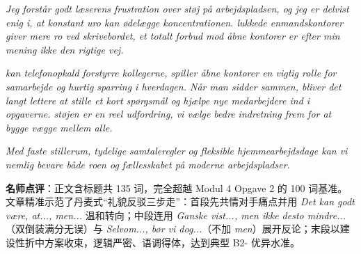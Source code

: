 \begin{answerbox}
\textit{Jeg forstår godt læserens frustration over støj på arbejdspladsen, og jeg er delvist enig i, at konstant uro kan ødelægge koncentrationen.  lukkede enmandskontorer giver mere ro ved skrivebordet,  et totalt forbud mod åbne kontorer er efter min mening ikke den rigtige vej.}

\textit{ kan telefonopkald forstyrre kollegerne,  spiller åbne kontorer en vigtig rolle for samarbejde og hurtig sparring i hverdagen. Når man sidder sammen, bliver det langt lettere at stille et kort spørgsmål og hjælpe nye medarbejdere ind i opgaverne.  støjen er en reel udfordring,  vi  vælge bedre indretning frem for at bygge vægge mellem alle.}

\textit{Med faste stillerum, tydelige samtaleregler og fleksible hjemmearbejdsdage kan vi nemlig bevare både roen og fællesskabet på moderne arbejdspladser.}

\small\textbf{名师点评}：正文含标题共 135 词，完全超越 Modul 4 Opgave 2 的 100 词基准。文章精准示范了丹麦式“礼貌反驳三步走”：首段先共情对手痛点并用 \textit{Det kan godt være, at..., men...} 温和转向；中段连用 \textit{Ganske vist..., men ikke desto mindre...}（双倒装满分无误）与 \textit{Selvom..., bør vi dog...}（不加 \textit{men}）展开反论；末段以建设性折中方案收束，逻辑严密、语调得体，达到典型 B2- 优异水准。
\end{answerbox}